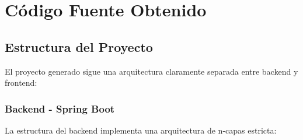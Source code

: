 \documentclass[11pt,a4paper]{article}
\begin{document}
\newpage

\section{Código Fuente Obtenido}

\subsection{Estructura del Proyecto}

El proyecto generado sigue una arquitectura claramente separada entre backend y frontend:

\subsubsection{Backend - Spring Boot}

La estructura del backend implementa una arquitectura de n-capas estricta:
\end{document}
